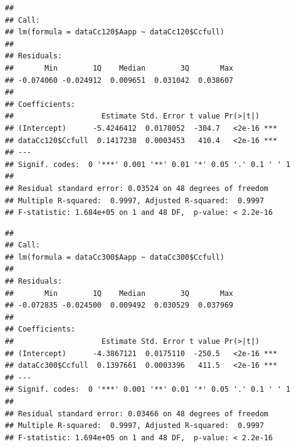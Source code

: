 \documentclass[
]{krantz}
\makeatletter
\newenvironment{Shaded}{\begin{snugshade}}{\end{snugshade}}
\newcommand{\DecValTok}[1]{\textcolor[rgb]{0.00,0.00,0.81}{#1}}
\newcommand{\FunctionTok}[1]{\textcolor[rgb]{0.00,0.00,0.00}{#1}}
\newcommand{\NormalTok}[1]{#1}
\newcommand{\OtherTok}[1]{\textcolor[rgb]{0.56,0.35,0.01}{#1}}
\newcommand{\SpecialCharTok}[1]{\textcolor[rgb]{0.00,0.00,0.00}{#1}}
\newenvironment{kframe}{%
\medskip{}
\setlength{\fboxsep}{.8em}
 \def\at@end@of@kframe{}%
 \ifinner\ifhmode%
  \def\at@end@of@kframe{\end{minipage}}%
  \begin{minipage}{\columnwidth}%
 \fi\fi%
 \def\FrameCommand##1{\hskip\@totalleftmargin \hskip-\fboxsep
 \colorbox{shadecolor}{##1}\hskip-\fboxsep
     \hskip-\linewidth \hskip-\@totalleftmargin \hskip\columnwidth}%
 \MakeFramed {\advance\hsize-\width
   \@totalleftmargin\z@ \linewidth\hsize
   \@setminipage}}%
 {\par\unskip\endMakeFramed%
 \at@end@of@kframe}
\renewenvironment{Shaded}{\begin{kframe}}{\end{kframe}}
\makeatother
\begin{document}
\begin{verbatim}
## 
## Call:
## lm(formula = dataCc120$Aapp ~ dataCc120$Ccfull)
## 
## Residuals:
##       Min        1Q    Median        3Q       Max 
## -0.074060 -0.024912  0.009651  0.031042  0.038607 
## 
## Coefficients:
##                    Estimate Std. Error t value Pr(>|t|)    
## (Intercept)      -5.4246412  0.0178052  -304.7   <2e-16 ***
## dataCc120$Ccfull  0.1417238  0.0003453   410.4   <2e-16 ***
## ---
## Signif. codes:  0 '***' 0.001 '**' 0.01 '*' 0.05 '.' 0.1 ' ' 1
## 
## Residual standard error: 0.03524 on 48 degrees of freedom
## Multiple R-squared:  0.9997, Adjusted R-squared:  0.9997 
## F-statistic: 1.684e+05 on 1 and 48 DF,  p-value: < 2.2e-16
\end{verbatim}

\begin{Shaded}
\end{Shaded}

\begin{verbatim}
## 
## Call:
## lm(formula = dataCc300$Aapp ~ dataCc300$Ccfull)
## 
## Residuals:
##       Min        1Q    Median        3Q       Max 
## -0.072835 -0.024500  0.009492  0.030529  0.037969 
## 
## Coefficients:
##                    Estimate Std. Error t value Pr(>|t|)    
## (Intercept)      -4.3867121  0.0175110  -250.5   <2e-16 ***
## dataCc300$Ccfull  0.1397661  0.0003396   411.5   <2e-16 ***
## ---
## Signif. codes:  0 '***' 0.001 '**' 0.01 '*' 0.05 '.' 0.1 ' ' 1
## 
## Residual standard error: 0.03466 on 48 degrees of freedom
## Multiple R-squared:  0.9997, Adjusted R-squared:  0.9997 
## F-statistic: 1.694e+05 on 1 and 48 DF,  p-value: < 2.2e-16
\end{verbatim}
\end{document}
